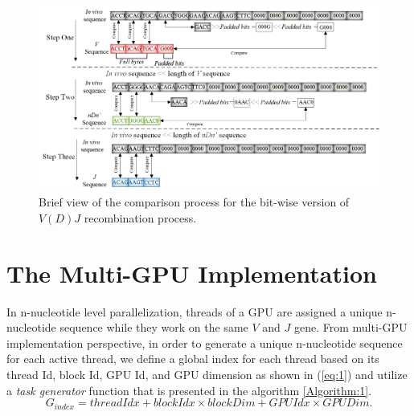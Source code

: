 \begin{figure}[htbp]
\begin{center}
\includegraphics[clip,width=1\columnwidth]{Figure/Fig.jpg}
\caption{Brief view of the comparison process for the bit-wise version of $V(D)J$ recombination process.}
\label{fig:Compare}
\end{center}
\end{figure}

\section {The Multi-GPU Implementation} \label{sec:Multi-GPU}

In n-nucleotide level parallelization, threads of a GPU are assigned a unique n-nucleotide sequence while they work on the same $V$ and $J$ gene. From multi-GPU implementation perspective, in order to generate a unique n-nucleotide sequence for each active thread, we define a global index for each thread based on its thread Id, block Id, GPU Id, and GPU dimension as shown in (\ref{eq:1}) and utilize a \emph{task generator} function that is presented in the algorithm \ref{Algorithm:1}.
\begin{equation}\label{eq:1}
G_{index} = threadIdx + blockIdx \times blockDim + GPUIdx \times GPUDim.
\end{equation}




